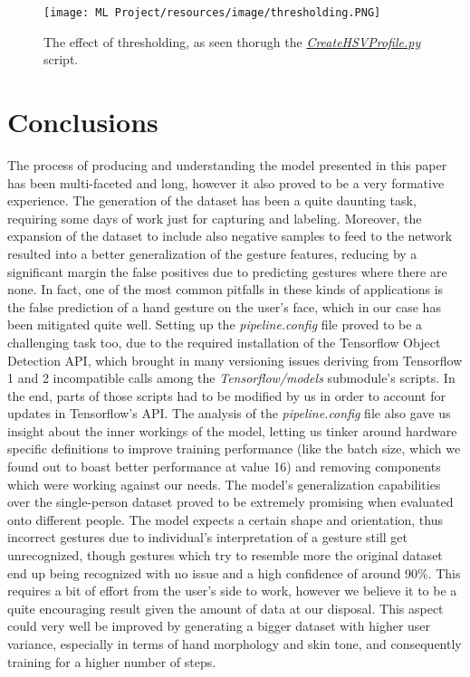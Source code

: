 \documentclass[a4paper, 12pt]{article}
\begin{document}
\begin{flushleft}
\begin{figure}[!h]
    \centering
    \texttt{[image: ML Project/resources/image/thresholding.PNG]} \caption{The effect of thresholding, as seen thorugh the \textit{\href{https://github.com/MarzioVallero/ML-Based-Blender-Gestural-Input-Interface/blob/master/CreateHSVProfile.py}{CreateHSVProfile.py}} script.}
\end{figure}
\label{figure6}

\end{flushleft}

\section{Conclusions}
\begin{flushleft}
The process of producing and understanding the model presented in this paper has been multi-faceted and long, however it also proved to be a very formative experience.\linebreak
The generation of the dataset has been a quite daunting task, requiring some days of work just for capturing and labeling. Moreover, the expansion of the dataset to include also negative samples to feed to the network resulted into a better generalization of the gesture features, reducing by a significant margin the false positives due to predicting gestures where there are none. In fact, one of the most common pitfalls in these kinds of applications is the false prediction of a hand gesture on the user's face, which in our case has been mitigated quite well.\linebreak
Setting up the \textit{pipeline.config} file proved to be a challenging task too, due to the required installation of the Tensorflow Object Detection API, which brought in many versioning issues deriving from Tensorflow 1 and 2 incompatible calls among the \textit{Tensorflow/models} submodule's scripts. In the end, parts of those scripts had to be modified by us in order to account for updates in Tensorflow's API.\linebreak
The analysis of the \textit{pipeline.config} file also gave us insight about the inner workings of the model, letting us tinker around hardware specific definitions to improve training performance (like the batch size, which we found out to boast better performance at value 16) and removing components which were working against our needs.\linebreak
The model's generalization capabilities over the single-person dataset proved to be extremely promising when evaluated onto different people. The model expects a certain shape and orientation, thus incorrect gestures due to individual's interpretation of a gesture still get unrecognized, though gestures which try to resemble more the original dataset end up being recognized with no issue and a high confidence of around 90\%. This requires a bit of effort from the user's side to work, however we believe it to be a quite encouraging result given the amount of data at our disposal. This aspect could very well be improved by generating a bigger dataset with higher user variance, especially in terms of hand morphology and skin tone, and consequently training for a higher number of steps.\linebreak

\end{flushleft}
\end{document}
